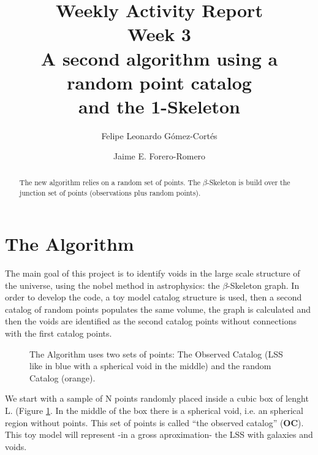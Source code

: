 \documentclass[preprint]{aastex62}
\begin{document}
\title{Weekly Activity Report\\Week 3\\A second algorithm using a random point catalog\\and the 1-Skeleton}


\author{Felipe Leonardo Gómez-Cortés}

\nocollaboration

\author{Jaime E. Forero-Romero}


\begin{abstract}
  The new algorithm relies on a random set of points. The $\beta$-Skeleton is build
  over the junction set of points (observations plus random points).
  

\end{abstract}

\section{The Algorithm}

The main goal of this project is to identify voids in the large scale structure
of the universe, using the nobel method in astrophysics: the $\beta$-Skeleton
graph. In order to develop the code, a toy model catalog structure is used,
then a second catalog of random points populates the same volume, the graph is
calculated and then the voids are identified as the second catalog points
without connections with the first catalog points.

\begin{figure}
    \caption{The Algorithm uses two sets of points: The Observed Catalog
      (LSS like in blue with a spherical void in the middle) and the
      random Catalog (orange). \label{slice_OC_plus_RC}}
\end{figure}

We start with a sample of N points randomly placed inside a cubic box of lenght L. (Figure \ref{slice_OC_plus_RC}.
In the middle of the box there is a spherical void, i.e. an spherical region
without points. This set of points is called ``the observed catalog''
(\textbf{OC}). This toy model
will represent -in a gross aproximation- the LSS with galaxies and voids.
\end{document}
